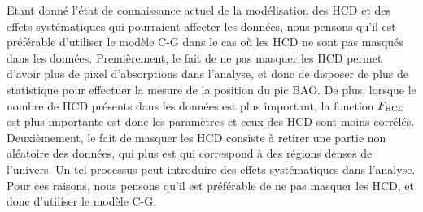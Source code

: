 Etant donné l'état de connaissance actuel de la modélisation des HCD et des effets systématiques qui pourraient affecter les données, nous pensons qu'il est préférable d'utiliser le modèle C-G dans le cas où les HCD ne sont pas masqués dans les données. Premièrement, le fait de ne pas masquer les HCD permet d'avoir plus de pixel d'absorptions dans l'analyse, et donc de disposer de plus de statistique pour effectuer la mesure de la position du pic BAO. De plus, lorsque le nombre de HCD présents dans les données est plus important, la fonction $F_{\textsc{HCD}}$ est plus importante est donc les paramètres \lya{} et ceux des HCD sont moins corrélés. Deuxièmement, le fait de masquer les HCD consiste à retirer une partie non aléatoire des données, qui plus est qui correspond à des régions denses de l'univers. Un tel processus peut introduire des effets systématiques dans l'analyse. Pour ces raisons, nous pensons qu'il est préférable de ne pas masquer les HCD, et donc d'utiliser le modèle C-G.



% 
